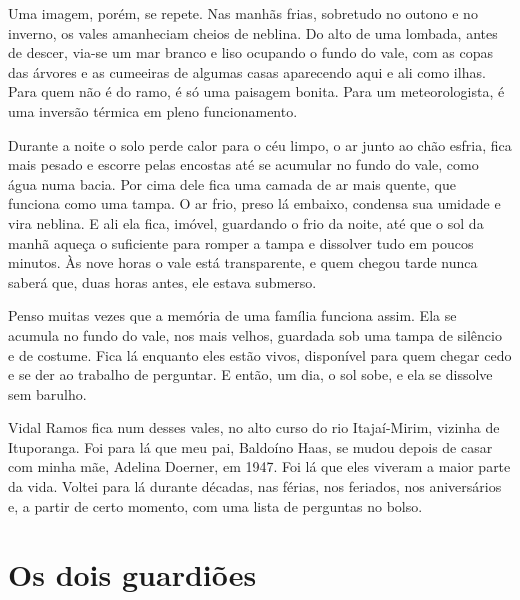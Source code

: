 \documentclass[
  brazilian,
  11pt,
  openany]{book}
\begin{document}
Uma imagem, porém, se repete. Nas manhãs frias, sobretudo no outono e no
inverno, os vales amanheciam cheios de neblina. Do alto de uma lombada,
antes de descer, via-se um mar branco e liso ocupando o fundo do vale,
com as copas das árvores e as cumeeiras de algumas casas aparecendo aqui
e ali como ilhas. Para quem não é do ramo, é só uma paisagem bonita.
Para um meteorologista, é uma inversão térmica em pleno funcionamento.

Durante a noite o solo perde calor para o céu limpo, o ar junto ao chão
esfria, fica mais pesado e escorre pelas encostas até se acumular no
fundo do vale, como água numa bacia. Por cima dele fica uma camada de ar
mais quente, que funciona como uma tampa. O ar frio, preso lá embaixo,
condensa sua umidade e vira neblina. E ali ela fica, imóvel, guardando o
frio da noite, até que o sol da manhã aqueça o suficiente para romper a
tampa e dissolver tudo em poucos minutos. Às nove horas o vale está
transparente, e quem chegou tarde nunca saberá que, duas horas antes,
ele estava submerso.

Penso muitas vezes que a memória de uma família funciona assim. Ela se
acumula no fundo do vale, nos mais velhos, guardada sob uma tampa de
silêncio e de costume. Fica lá enquanto eles estão vivos, disponível
para quem chegar cedo e se der ao trabalho de perguntar. E então, um
dia, o sol sobe, e ela se dissolve sem barulho.

Vidal Ramos fica num desses vales, no alto curso do rio Itajaí-Mirim,
vizinha de Ituporanga. Foi para lá que meu pai, Baldoíno Haas, se mudou
depois de casar com minha mãe, Adelina Doerner, em 1947. Foi lá que eles
viveram a maior parte da vida. Voltei para lá durante décadas, nas
férias, nos feriados, nos aniversários e, a partir de certo momento, com
uma lista de perguntas no bolso.

\section{Os dois guardiões}\label{os-dois-guardiuxf5es}
\end{document}
